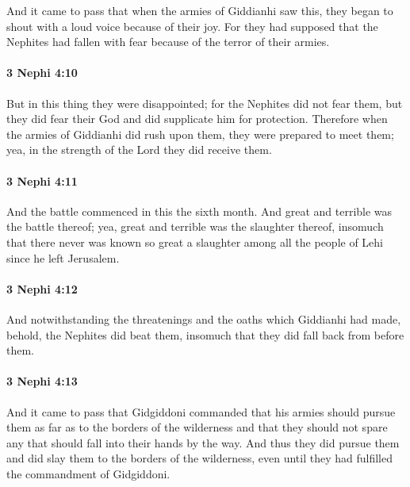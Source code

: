 			And it came to pass that when the armies of Giddianhi saw this,
			they began to shout with a loud voice because of their joy.
			For they had supposed that the Nephites had fallen with fear
			because of the terror of their armies.

		\paragraph{3 Nephi 4:10} %
			\label{3NEPHI-4-10}

			But in this thing they were disappointed;
			for the Nephites did not fear them,
			but they did fear their God and did supplicate him for protection.
			Therefore when the armies of Giddianhi did rush upon them,
			they were prepared to meet them;
			yea, in the strength of the Lord they did receive them.

		\paragraph{3 Nephi 4:11} %
			\label{3NEPHI-4-11}

			And the battle commenced in this the sixth month.
			And great and terrible was the battle thereof;
			yea, great and terrible was the slaughter thereof,
			insomuch that there never was known so great a slaughter
			among all the people of Lehi since he left Jerusalem.

		\paragraph{3 Nephi 4:12} %
			\label{3NEPHI-4-12}

			And notwithstanding the threatenings and the oaths which Giddianhi had made,
			behold, the Nephites did beat them,
			insomuch that they did fall back from before them.

		\paragraph{3 Nephi 4:13} %
			\label{3NEPHI-4-13}

			And it came to pass that Gidgiddoni commanded
			that his armies should pursue them as far as to the borders of the wilderness
			and that they should not spare any that should fall into their hands by the way.
			And thus they did pursue them and did slay them to the borders of the wilderness,
			even until they had fulfilled the commandment of Gidgiddoni.

